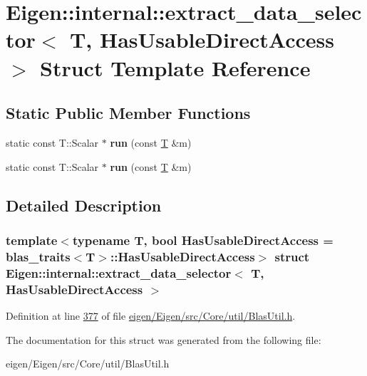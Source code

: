 \hypertarget{struct_eigen_1_1internal_1_1extract__data__selector}{}\section{Eigen\+:\+:internal\+:\+:extract\+\_\+data\+\_\+selector$<$ T, Has\+Usable\+Direct\+Access $>$ Struct Template Reference}
\label{struct_eigen_1_1internal_1_1extract__data__selector}
\subsection*{Static Public Member Functions}
\begin{DoxyCompactItemize}
\item 
\mbox{\label{struct_eigen_1_1internal_1_1extract__data__selector_a5e4c8df8b5b38f6787b61035b5118d77}} 
static const T\+::\+Scalar $\ast$ {\bfseries run} (const \hyperlink{group___sparse_core___module}{T} \&m)
\item 
\mbox{\label{struct_eigen_1_1internal_1_1extract__data__selector_a5e4c8df8b5b38f6787b61035b5118d77}} 
static const T\+::\+Scalar $\ast$ {\bfseries run} (const \hyperlink{group___sparse_core___module}{T} \&m)
\end{DoxyCompactItemize}


\subsection{Detailed Description}
\subsubsection*{template$<$typename T, bool Has\+Usable\+Direct\+Access = blas\+\_\+traits$<$\+T$>$\+::\+Has\+Usable\+Direct\+Access$>$\newline
struct Eigen\+::internal\+::extract\+\_\+data\+\_\+selector$<$ T, Has\+Usable\+Direct\+Access $>$}



Definition at line \hyperlink{eigen_2_eigen_2src_2_core_2util_2_blas_util_8h_source_l00377}{377} of file \hyperlink{eigen_2_eigen_2src_2_core_2util_2_blas_util_8h_source}{eigen/\+Eigen/src/\+Core/util/\+Blas\+Util.\+h}.



The documentation for this struct was generated from the following file\+:\begin{DoxyCompactItemize}
\item 
eigen/\+Eigen/src/\+Core/util/\+Blas\+Util.\+h\end{DoxyCompactItemize}
